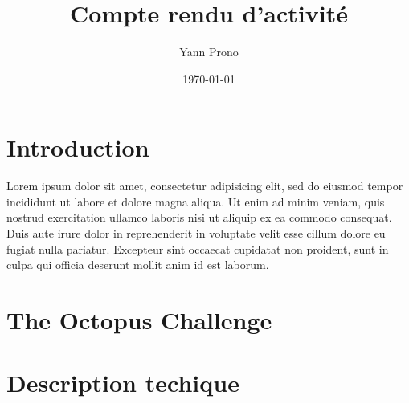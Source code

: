 \documentclass[a4paper,11pt, oneside]{book}
\title{Compte rendu d'activité}
\author{Yann Prono}
\date{\today}
\def\appName{The Octopus Challenge}
\begin{document}
	\begin{titlepage}
		
	\end{titlepage}


	\newpage

	\newpage\null\thispagestyle{empty}\newpage
	\setcounter{page}{1}
	\tableofcontents

	\chapter{Introduction}
	Lorem ipsum dolor sit amet, consectetur adipisicing elit, sed do eiusmod tempor incididunt ut labore et dolore magna aliqua. Ut enim ad minim veniam, quis nostrud exercitation ullamco laboris nisi ut aliquip ex ea commodo consequat. Duis aute irure dolor in reprehenderit in voluptate velit esse cillum dolore eu fugiat nulla pariatur. Excepteur sint occaecat cupidatat non proident, sunt in culpa qui officia deserunt mollit anim id est laborum.
	\clearpage

	\chapter{\appName}
	\clearpage

	\chapter{Description techique}
	\clearpage
\end{document}
